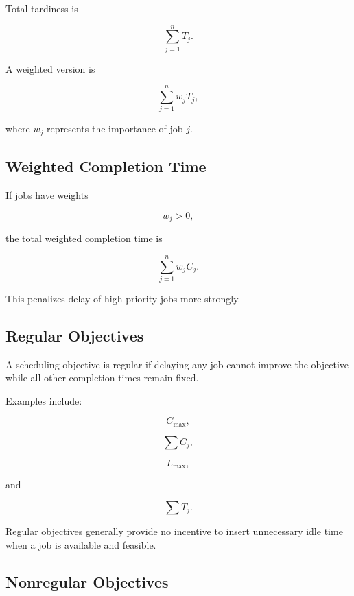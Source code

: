 Total tardiness is

\[
\boxed{
\sum_{j=1}^{n}
T_j.
}
\]

A weighted version is

\[
\boxed{
\sum_{j=1}^{n}
w_jT_j,
}
\]

where \(w_j\) represents the importance of job \(j\).

\subsection{Weighted Completion Time}
\label{subsec:weighted-completion-time}

If jobs have weights

\[
w_j>0,
\]

the total weighted completion time is

\[
\boxed{
\sum_{j=1}^{n}
w_jC_j.
}
\]

This penalizes delay of high-priority jobs more strongly.

\subsection{Regular Objectives}
\label{subsec:regular-scheduling-objectives}

A scheduling objective is regular if delaying any job cannot improve the
objective while all other completion times remain fixed.

Examples include:

\[
\boxed{
C_{\max},
}
\]

\[
\boxed{
\sum C_j,
}
\]

\[
\boxed{
L_{\max},
}
\]

and

\[
\boxed{
\sum T_j.
}
\]

Regular objectives generally provide no incentive to insert unnecessary
idle time when a job is available and feasible.

\subsection{Nonregular Objectives}
\label{subsec:nonregular-scheduling-objectives}

